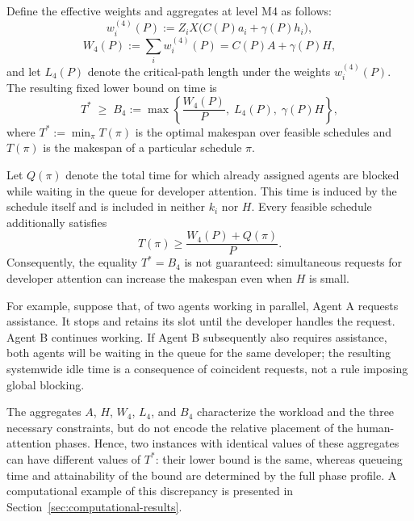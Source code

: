\begin{remark}
Define the effective weights and aggregates at level M4 as follows:
\[
  w_i^{(4)}(P):=Z_iX\bigl(C(P)a_i+\gamma(P)h_i\bigr),
\]
\[
  W_4(P):=\sum_iw_i^{(4)}(P)=C(P)A+\gamma(P)H,
\]
and let $L_4(P)$ denote the critical-path length under the weights $w_i^{(4)}(P)$. The resulting fixed lower bound on time is
\[
  T^{*} \;\ge\; B_4 := \max\left\{ \frac{W_4(P)}{P},\; L_4(P),\; \gamma(P)H \right\},
\]
where $T^{*}:=\min_{\pi}T(\pi)$ is the optimal makespan over feasible schedules and $T(\pi)$ is the makespan of a particular schedule $\pi$.

Let $Q(\pi)$ denote the total time for which already assigned agents are blocked while waiting in the queue for developer attention. This time is induced by the schedule itself and is included in neither $k_i$ nor $H$. Every feasible schedule additionally satisfies
\[
  T(\pi)\ge \frac{W_4(P)+Q(\pi)}{P}.
\]
Consequently, the equality $T^{*}=B_4$ is not guaranteed: simultaneous requests for developer attention can increase the makespan even when $H$ is small.

For example, suppose that, of two agents working in parallel, Agent A requests assistance. It stops and retains its slot until the developer handles the request. Agent B continues working. If Agent B subsequently also requires assistance, both agents will be waiting in the queue for the same developer; the resulting systemwide idle time is a consequence of coincident requests, not a rule imposing global blocking.

The aggregates $A$, $H$, $W_4$, $L_4$, and $B_4$ characterize the workload and the three necessary constraints, but do not encode the relative placement of the human-attention phases. Hence, two instances with identical values of these aggregates can have different values of $T^{*}$: their lower bound is the same, whereas queueing time and attainability of the bound are determined by the full phase profile. A computational example of this discrepancy is presented in Section~\ref{sec:computational-results}.
\end{remark}


